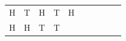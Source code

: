 {\begin{tabular}[t]{|l|l|l|l|l|l|l|l|l|l|}
        H &
    
    
        T &
    
    
        H &
    
    
        T &
    
    
        H%
     \tabularnewline\cline{1-1}\cline{2-2}\cline{3-3}\cline{4-4}\cline{5-5}\cline{6-6}\cline{7-7}\cline{8-8}\cline{9-9}\cline{10-10}
    
    
        H &
    
    
        H &
    
    
        T &
    
    
        T &
    

\end{tabular}}
